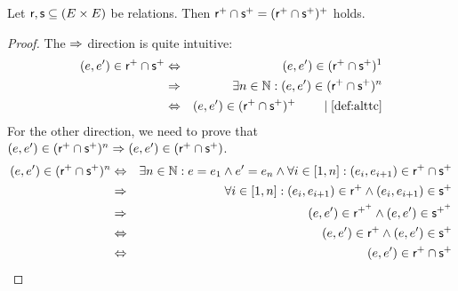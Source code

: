\documentclass[a4paper,twoside,12pt, english]{article}
\begin{document}
\begin{lemma}\label{lem:+cap+}
Let $\textsf{\upshape r},\textsf{\upshape s} \subseteq (E \times E)$ be relations. Then $\sf r^+ \cap s^+ = (r^+ \cap s^+)^+$ holds. 
\end{lemma}
\begin{proof} The $\Rightarrow$ direction is quite intuitive:
\begin{eqnarray*}
\edgein \relr^+ \cap \rels^+ &\Leftrightarrow & \edgein (\relr^+ \cap \rels^+)^1 \\
&\impl & \exists n \in \N: \edgein (\relr^+ \cap \rels^+)^n \\
&\Leftrightarrow & (e,e') \in {\sf (r^+ \cap s^+)^+} \reason{\Cref{def:alttc}}
\end{eqnarray*}
For the other direction, we need to prove that $(e,e') \in  (\textsf{\upshape r}^+ \cap \textsf{\upshape s}^+)^n \Rightarrow (e,e') \in  (\textsf{\upshape r}^+ \cap \textsf{\upshape s}^+)$. 
\begin{eqnarray*}
(e,e') \in  (\textsf{\upshape r}^+ \cap \textsf{\upshape s}^+)^n &\Leftrightarrow & \exists n\in \mathbb{N}: e=e_1 \land e'=e_n \land \forall i \in [1,n]: (e_i,e_{i+1}) \in \textsf{\upshape r}^+ \cap \textsf{\upshape s}^+ \\
& \Rightarrow & \forall i \in [1,n]: (e_i,e_{i+1}) \in \textsf{\upshape r}^+ \land (e_i,e_{i+1}) \in \textsf{\upshape s}^+ \\
& \Rightarrow & (e,e') \in  \textsf{\upshape r}^{+^+} \land (e,e') \in  \textsf{\upshape s}^{+^+} \\
& \Leftrightarrow & (e,e') \in  \textsf{\upshape r}^+ \land (e,e') \in  \textsf{\upshape s}^+ \\
& \Leftrightarrow & (e,e') \in  \textsf{\upshape r}^+ \cap \textsf{\upshape s}^+
\end{eqnarray*}
\end{proof}
\end{document}
